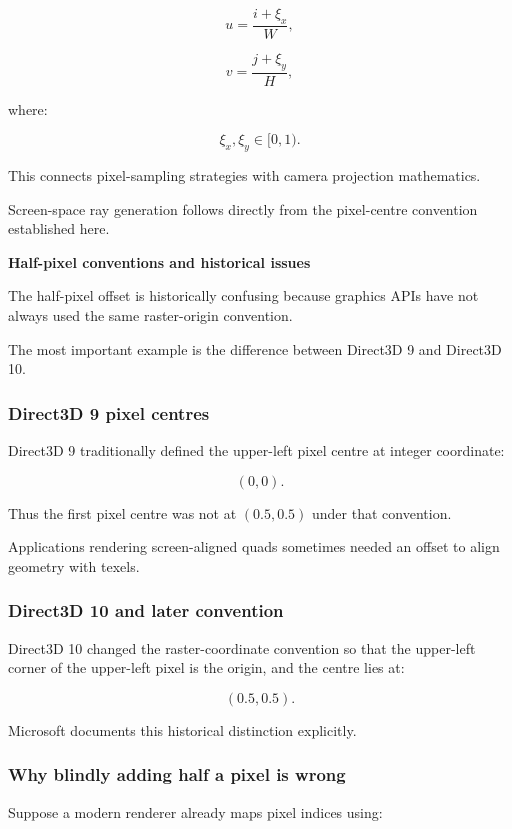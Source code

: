 \[
 u=\frac{i+\xi_x}{W},
\]

\[
 v=\frac{j+\xi_y}{H},
\]

where:

\[
 \xi_x,\xi_y\in[0,1).
\]

This connects pixel-sampling strategies with camera projection mathematics.

Screen-space ray generation follows directly from the pixel-centre convention established here.

\textbf{Half-pixel conventions and historical issues}

The half-pixel offset is historically confusing because graphics APIs have not always used the same raster-origin convention.

The most important example is the difference between Direct3D 9 and Direct3D 10.

\subsubsection{Direct3D 9 pixel centres}\label{direct3d-9-pixel-centres}

Direct3D 9 traditionally defined the upper-left pixel centre at integer coordinate:

\[
 \boxed{(0,0)}.
\]

Thus the first pixel centre was not at \((0.5,0.5)\) under that convention.

Applications rendering screen-aligned quads sometimes needed an offset to align geometry with texels.

\subsubsection{Direct3D 10 and later convention}\label{direct3d-10-and-later-convention}

Direct3D 10 changed the raster-coordinate convention so that the upper-left corner of the upper-left pixel is the origin, and the centre lies at:

\[
 \boxed{(0.5,0.5)}.
\]

Microsoft documents this historical distinction explicitly. 

\subsubsection{Why blindly adding half a pixel is wrong}\label{why-blindly-adding-half-a-pixel-is-wrong}

Suppose a modern renderer already maps pixel indices using:

